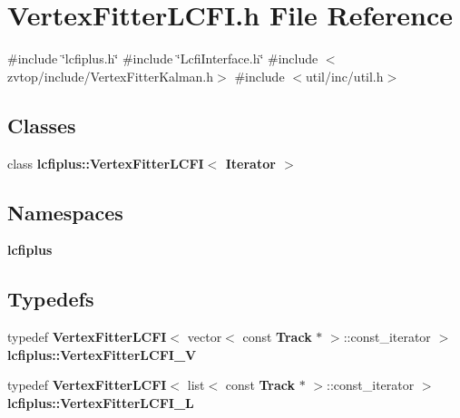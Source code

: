 \section{Vertex\+Fitter\+L\+C\+F\+I.\+h File Reference}
\label{VertexFitterLCFI_8h}
{\ttfamily \#include \char`\"{}lcfiplus.\+h\char`\"{}}\newline
{\ttfamily \#include \char`\"{}Lcfi\+Interface.\+h\char`\"{}}\newline
{\ttfamily \#include $<$zvtop/include/\+Vertex\+Fitter\+Kalman.\+h$>$}\newline
{\ttfamily \#include $<$util/inc/util.\+h$>$}\newline
\subsection*{Classes}
\begin{DoxyCompactItemize}
\item 
class \textbf{ lcfiplus\+::\+Vertex\+Fitter\+L\+C\+F\+I$<$ Iterator $>$}
\end{DoxyCompactItemize}
\subsection*{Namespaces}
\begin{DoxyCompactItemize}
\item 
 \textbf{ lcfiplus}
\end{DoxyCompactItemize}
\subsection*{Typedefs}
\begin{DoxyCompactItemize}
\item 
typedef \textbf{ Vertex\+Fitter\+L\+C\+FI}$<$ vector$<$ const \textbf{ Track} $\ast$ $>$\+::const\+\_\+iterator $>$ \textbf{ lcfiplus\+::\+Vertex\+Fitter\+L\+C\+F\+I\+\_\+V}
\item 
typedef \textbf{ Vertex\+Fitter\+L\+C\+FI}$<$ list$<$ const \textbf{ Track} $\ast$ $>$\+::const\+\_\+iterator $>$ \textbf{ lcfiplus\+::\+Vertex\+Fitter\+L\+C\+F\+I\+\_\+L}
\end{DoxyCompactItemize}
